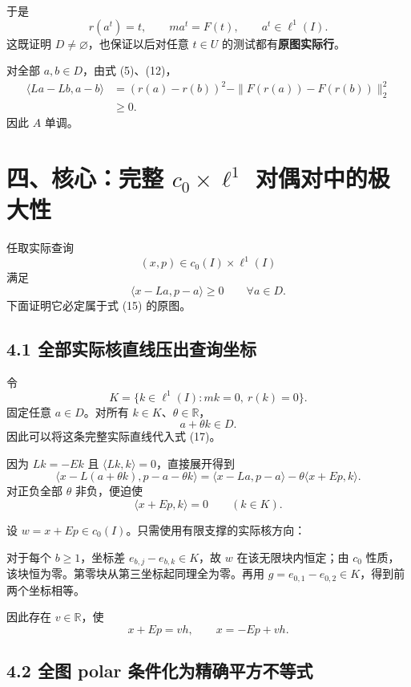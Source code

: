 \documentclass[UTF8,fontset=fandol,11pt,a4paper]{ctexart}
\begin{document}
于是 \[
r(a^t)=t,\qquad ma^t=F(t),\qquad a^t\in\ell^1(I).
\] 这既证明 $D\ne\varnothing$，也保证以后对任意 $t\in U$ 的测试都有\textbf{原图实际行}。

对全部 $a,b\in D$，由式 (5)、(12)， \[
\begin{aligned}
\langle La-Lb,a-b\rangle
&=(r(a)-r(b))^2
-\|F(r(a))-F(r(b))\|_2^2\\
&\ge0.
\end{aligned}
\tag{16}
\] 因此 $A$ 单调。

\section{\texorpdfstring{四、核心：完整 $c_0\times\ell^1$ 对偶对中的极大性}{四、核心：完整 c\_0\textbackslash times\textbackslash ell\^{}1 对偶对中的极大性}}\label{ux56dbux6838ux5fc3ux5b8cux6574-c_0timesell1-ux5bf9ux5076ux5bf9ux4e2dux7684ux6781ux5927ux6027}

任取实际查询 \[
(x,p)\in c_0(I)\times\ell^1(I)
\] 满足 \[
\langle x-La,p-a\rangle\ge0
\qquad\forall a\in D.
\tag{17}
\] 下面证明它必定属于式 (15) 的原图。

\subsection{4.1 全部实际核直线压出查询坐标}\label{ux5168ux90e8ux5b9eux9645ux6838ux76f4ux7ebfux538bux51faux67e5ux8be2ux5750ux6807}

令 \[
K=\{k\in\ell^1(I):mk=0,\ r(k)=0\}.
\] 固定任意 $a\in D$。对所有 $k\in K$、$\theta\in\mathbb R$， \[
a+\theta k\in D.
\] 因此可以将这条完整实际直线代入式 (17)。

因为 $Lk=-Ek$ 且 $\langle Lk,k\rangle=0$，直接展开得到 \[
\boxed{
\langle x-L(a+\theta k),p-a-\theta k\rangle
=
\langle x-La,p-a\rangle
-\theta\langle x+Ep,k\rangle.
}
\tag{18}
\] 对正负全部 $\theta$ 非负，便迫使 \[
\langle x+Ep,k\rangle=0\qquad(k\in K).
\tag{19}
\]

设 $w=x+Ep\in c_0(I)$。只需使用有限支撑的实际核方向：

对于每个 $b\ge1$，坐标差 $e_{b,j}-e_{b,k}\in K$，故 $w$ 在该无限块内恒定；由 $c_0$ 性质，该块恒为零。第零块从第三坐标起同理全为零。再用 $g=e_{0,1}-e_{0,2}\in K$，得到前两个坐标相等。

因此存在 $v\in\mathbb R$，使 \[
\boxed{x+Ep=vh,\qquad x=-Ep+vh.}
\tag{20}
\]

\subsection{4.2 全图 polar 条件化为精确平方不等式}\label{ux5168ux56fe-polar-ux6761ux4ef6ux5316ux4e3aux7cbeux786eux5e73ux65b9ux4e0dux7b49ux5f0f}
\end{document}
